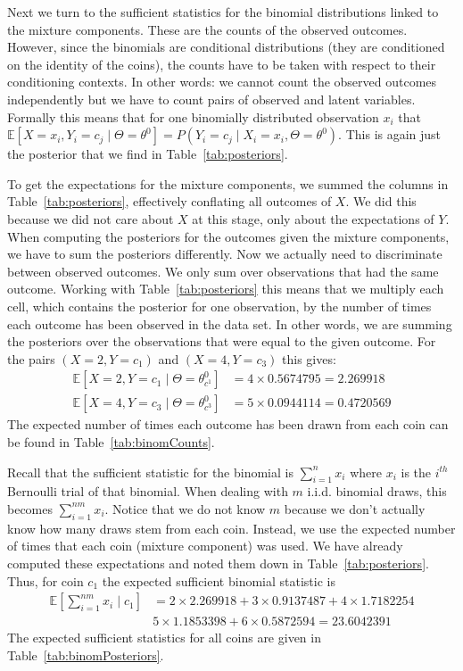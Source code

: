 \documentclass[a4paper,11pt,leqno]{report}\usepackage[]{graphicx}\usepackage[]{color}
\newcommand{\E}{\mathbb{E}}
\begin{document}
Next we turn to the sufficient statistics for the binomial distributions linked to the mixture components. These are the counts of the observed outcomes. However,
since the binomials are conditional distributions (they are conditioned on the identity of the coins), the counts have to be taken with respect to their conditioning
contexts. In other words: we cannot count the observed outcomes independently but we have to count pairs of observed and latent variables. Formally this means that 
for one binomially distributed observation $ x_{i} $ that $ \E[X=x_{i},Y_{i}=c_{j} \mid \Theta=\theta^{0}] = P(Y_{i}=c_{j} \mid X_{i}=x_{i}, \Theta=\theta^{0}) $. This is again
just the posterior that we find in Table~\ref{tab:posteriors}. 

To get the expectations for the mixture components, we summed the columns in Table~\ref{tab:posteriors}, effectively conflating all outcomes of $ X $. We did this
because we did not care about $ X $ at this stage, only about the expectations of $ Y $. When computing the posteriors for the outcomes given the mixture components,
we have to sum the posteriors differently. Now we actually need to discriminate between
observed outcomes. We only sum over observations that had the same outcome. Working with Table~\ref{tab:posteriors} this means that we multiply each
cell, which contains the posterior for one observation, by the number of times each outcome has been observed in the data set. In other words, we are summing
the posteriors over the observations that were equal to the given outcome. For the pairs $ (X=2,Y=c_{1}) $
and $ (X=4,Y = c_{3}) $ this gives:
\begin{align}
\E[X=2,Y=c_{1} \mid \Theta=\theta^{0}_{c^{1}}] &= 4 \times 0.5674795 = 2.269918 \\
\E[X=4,Y=c_{3} \mid \Theta=\theta^{0}_{c^{3}}] &= 5 \times 0.0944114 = 0.4720569
\end{align} 
The expected number of times each outcome has been drawn from each coin can be found in Table~\ref{tab:binomCounts}. 

Recall that the sufficient statistic for the binomial is 
$ \sum_{i=1}^{n} x_{i} $ where $ x_{i} $ is the $ i^{th} $ Bernoulli trial of that binomial. 
When dealing with $ m $ i.i.d. binomial draws, this becomes $ \sum_{i=1}^{nm} x_{i} $. Notice that we do not
know $ m $ because we don't actually know how many draws stem from each coin. Instead, we use the expected number of times
that each coin (mixture component) was used. We have already computed these expectations and noted them down in Table~\ref{tab:posteriors}. Thus, for coin $ c_{1} $
the expected sufficient binomial statistic is
\begin{align}
\E\left[\sum_{i=1}^{nm} x_{i}\mid c_{1}\right] &= 2 \times 2.269918 + 3 \times 0.9137487 + 4 \times 1.7182254  \\
&5 \times 1.1853398 + 6 \times 0.5872594 = 23.6042391 \nonumber
\end{align}
The expected sufficient statistics for all coins are given in Table~\ref{tab:binomPosteriors}.
\end{document}
